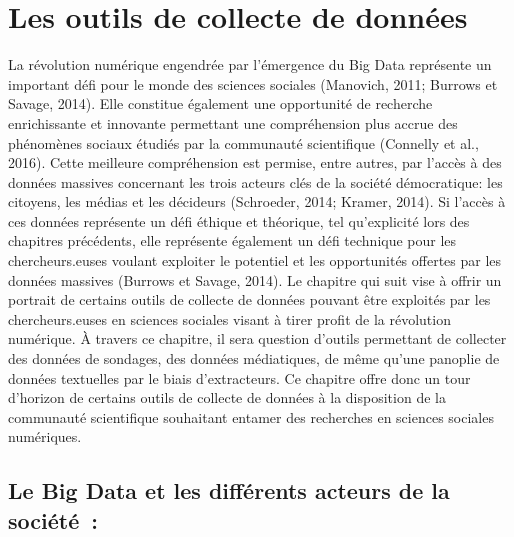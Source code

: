 \documentclass[
  letterpaper,
]{scrbook}
\begin{document}

\hypertarget{les-outils-de-collecte-de-donnuxe9es}{%
\chapter{Les outils de collecte de
données}\label{les-outils-de-collecte-de-donnuxe9es}}

La révolution numérique engendrée par l'émergence du Big Data représente
un important défi pour le monde des sciences sociales (Manovich, 2011;
Burrows et Savage, 2014). Elle constitue également une opportunité de
recherche enrichissante et innovante permettant une compréhension plus
accrue des phénomènes sociaux étudiés par la communauté scientifique
(Connelly et al., 2016). Cette meilleure compréhension est permise,
entre autres, par l'accès à des données massives concernant les trois
acteurs clés de la société démocratique: les citoyens, les médias et les
décideurs (Schroeder, 2014; Kramer, 2014). Si l'accès à ces données
représente un défi éthique et théorique, tel qu'explicité lors des
chapitres précédents, elle représente également un défi technique pour
les chercheurs.euses voulant exploiter le potentiel et les opportunités
offertes par les données massives (Burrows et Savage, 2014). Le chapitre
qui suit vise à offrir un portrait de certains outils de collecte de
données pouvant être exploités par les chercheurs.euses en sciences
sociales visant à tirer profit de la révolution numérique. À travers ce
chapitre, il sera question d'outils permettant de collecter des données
de sondages, des données médiatiques, de même qu'une panoplie de données
textuelles par le biais d'extracteurs. Ce chapitre offre donc un tour
d'horizon de certains outils de collecte de données à la disposition de
la communauté scientifique souhaitant entamer des recherches en sciences
sociales numériques.

\hypertarget{le-big-data-et-les-diffuxe9rents-acteurs-de-la-sociuxe9tuxe9}{%
\section{\texorpdfstring{\textbf{Le Big Data et les différents acteurs
de la
société~:}}{Le Big Data et les différents acteurs de la société~:}}\label{le-big-data-et-les-diffuxe9rents-acteurs-de-la-sociuxe9tuxe9}}
\end{document}
